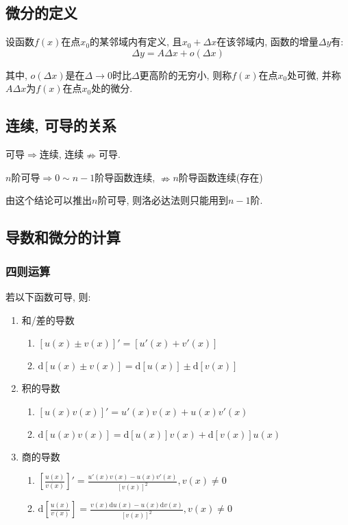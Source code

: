 \subsection{微分的定义}
设函数$ f(x) $在点$ x_{0} $的某邻域内有定义, 且$ x_{0}+\Delta x $在该邻域内, 函数的增量$ \Delta y $有:
\begin{equation*}
\Delta y=A\Delta x+o(\Delta x)
\end{equation*}\par
其中, $ o(\Delta x) $是在$ \Delta \rightarrow 0 $时比$ \Delta $更高阶的无穷小, 则称$ f(x) $在点$ x_{0} $处可微, 并称$ A\Delta x $为$ f(x) $在点$ x_{0} $处的微分.
\subsection{连续, 可导的关系}
可导$ \Rightarrow $连续, 连续$ \nRightarrow $可导.
\begin{tcolorbox}
$ n $阶可导$ \Rightarrow 0\sim n-1 $阶导函数连续, $ \nRightarrow n $阶导函数连续(存在)\par
由这个结论可以推出$ n $阶可导, 则洛必达法则只能用到$ n-1 $阶.
\end{tcolorbox}
\subsection{导数和微分的计算}\label{求导的方法}
\subsubsection{四则运算}
若以下函数可导, 则:
\begin{enumerate}
\item 和/差的导数
\begin{enumerate}
\item $ [u(x)\pm v(x)]'=[u'(x)+v'(x)] $
\item $ \mathrm{d}[u(x)\pm v(x)]=\mathrm{d}[u(x)]\pm \mathrm{d}[v(x)] $
\end{enumerate}
\item 积的导数
\begin{enumerate}
\item $ [u(x)v(x)]'=u'(x)v(x)+u(x)v'(x) $
\item $ \mathrm{d}[u(x)v(x)]=\mathrm{d}[u(x)]v(x)+\mathrm{d}[v(x)]u(x) $
\end{enumerate}
\item 商的导数
\begin{enumerate}
\item $ [\frac{u(x)}{v(x)}]'=\frac{u'(x)v(x)-u(x)v'(x)}{[v(x)]^{2}}, v(x)\neq 0 $
\item $ \mathrm{d}[\frac{u(x)}{v(x)}]=\frac{v(x)\mathrm{d}u(x)-u(x)\mathrm{d}v(x)}{[v(x)]^{2}}, v(x)\neq 0 $
\end{enumerate}
\end{enumerate}
